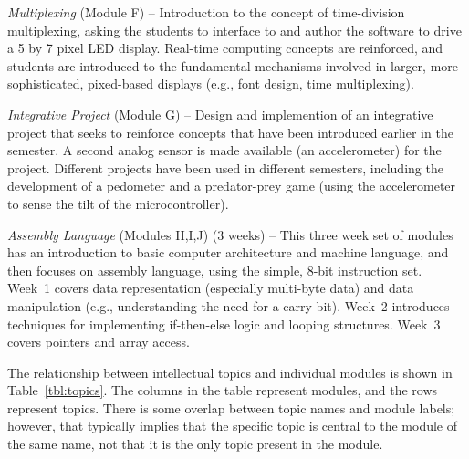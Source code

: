 \emph{Multiplexing} (Module F) --
Introduction to the concept of time-division multiplexing, asking the
students to interface to and author the software to drive a 5 by 7 pixel
LED display. Real-time computing concepts are reinforced, and students
are introduced to the fundamental mechanisms involved in larger, more
sophisticated, pixed-based displays (e.g., font design, time multiplexing).

\emph{Integrative Project} (Module G) --
Design and implemention of an integrative project
that seeks to reinforce concepts that have been introduced earlier in the
semester.  A second analog sensor is made available (an accelerometer)
for the project.
Different projects have been used in different semesters, including
the development of a pedometer and a predator-prey game (using the
accelerometer to sense the tilt of the microcontroller).

\emph{Assembly Language} (Modules H,I,J) (3 weeks) --
This three week set of modules has an introduction to basic computer
architecture
and machine language, and then
focuses on assembly language, using the simple, 8-bit instruction set.
Week~1 covers data representation (especially multi-byte
data) and data manipulation
(e.g., understanding the need for a carry bit).
Week~2 introduces techniques for implementing if-then-else logic
and looping structures.
Week~3 covers pointers and array access.

The relationship between intellectual topics and individual modules is
shown in Table~\ref{tbl:topics}. The columns in the table represent
modules, and the rows represent topics.
There is some overlap between topic names and module labels; however, that
typically implies that the specific topic is central to the module of the
same name, not that it is the only topic present in the module.

